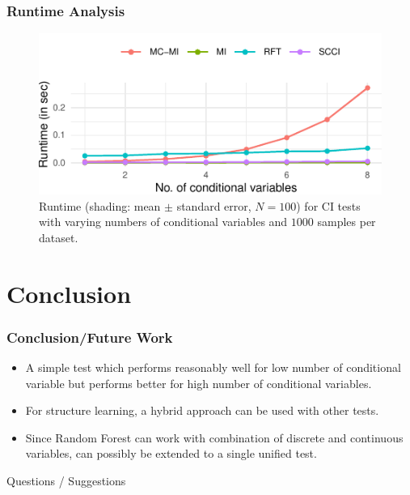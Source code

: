 \documentclass{beamer}
\begin{document}
\begin{frame}
	\frametitle{Runtime Analysis}
	\begin{figure}
		\centering
		\includegraphics{imgs/runtime.pdf}
		\caption*{Runtime (shading: mean $\pm$ standard error, $N=100$)
		for CI tests with varying numbers of conditional variables and
		$1000$ samples per dataset.
		}
	\end{figure}
\end{frame}

\section{Conclusion}
\begin{frame}
	\frametitle{Conclusion/Future Work}
	\begin{itemize}
		\setlength\itemsep{1em}
		\item A simple test which performs reasonably well for low number of
			conditional variable but performs better for high number of
			conditional variables.
		\item For structure learning, a hybrid approach can be used with other
			tests.
		\item Since Random Forest can work with combination of discrete and 
			continuous variables, can possibly be extended to a single 
			unified test.
	\end{itemize}
\end{frame}

\begin{frame}
	Questions / Suggestions
\end{frame}
\end{document}
